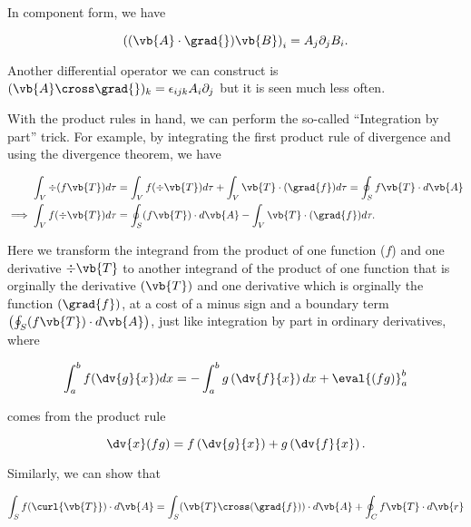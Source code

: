 \documentclass[english,a4paper,12pt]{report}
\begin{document}
In component form, we have 

\begin{equation}
	\left( (\vb{A} \cdot \grad{} )\vb{B}  \right)_{i} = A_{j}\partial _{j}B _{i}.    
\end{equation}

Another differential operator we can construct is \((\vb{A} \cross  \grad{} )_{k} = \epsilon _{ijk} A_{i}\partial _{j}     \) but it is seen much less often. 
	
With the product rules in hand, we can perform the so-called ``Integration by part'' trick. For example, by integrating the first product rule of divergence and using the divergence theorem, we have
	
\begin{equation} 
	\begin{aligned}
	\int_{V} \div{(f\vb{T})} d\tau &= \int_{V} f(\div{\vb{T}}) d\tau + \int_{V} \vb{T} \cdot (\grad{f}) d\tau = \oint_{S} f\vb{T} \cdot d\vb{A} \\
	\implies \int_{V} f(\div{\vb{T}}) d\tau &= \oint_{S} (f\vb{T}) \cdot d\vb{A} - \int_{V} \vb{T} \cdot (\grad{f}) d\tau. 
	\end{aligned}
\end{equation}
	
Here we transform the integrand from the product of one function (\(f\)) and one derivative \(\div{\vb{T}}\) to another integrand of the product of one function that is orginally the derivative \((\vb{T})\) and one derivative which is orginally the function \((\grad{f})\), at a cost of a minus sign and a boundary term \(\left(\oint_{S} (f\vb{T}) \cdot d\vb{A}\right)\), just like integration by part in ordinary derivatives, where
	
\begin{equation} 
	\int_{a}^{b} f(\dv{g}{x})dx = -\int_{a}^{b} g\left(\dv{f}{x}\right)dx + \eval{\left(fg\right)}_a^b 
\end{equation}
	
comes from the product rule
	
\begin{equation} 
	\dv{x}(fg) = f\left(\dv{g}{x}\right) + g\left(\dv{f}{x}\right). 
\end{equation}

Similarly, we can show that 
	
\begin{equation} 
	\int_{S} f(\curl{\vb{T}}) \cdot d\vb{A} = \int_{S} (\vb{T} \cross (\grad{f})) \cdot d\vb{A} + \oint_{C} f\vb{T} \cdot d\vb{r} 
\end{equation}
	
\end{document}

